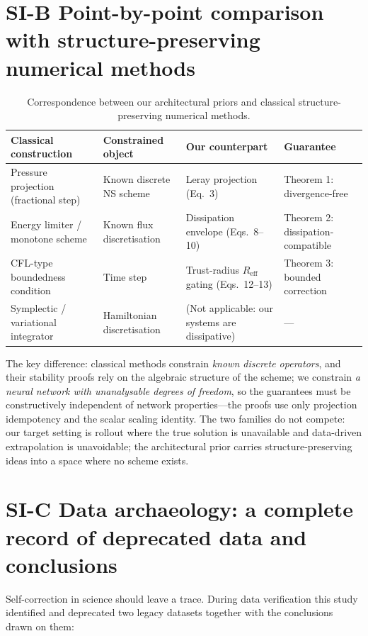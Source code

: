 \documentclass[11pt,a4paper]{article}
\begin{document}
\section*{SI-B \quad Point-by-point comparison with structure-preserving numerical methods}

\begin{table}[htbp]
\centering\small
\caption{Correspondence between our architectural priors and classical structure-preserving numerical methods.}
\begin{tabular}{llll}
\toprule
Classical construction & Constrained object & Our counterpart & Guarantee \\
\midrule
Pressure projection (fractional step) & Known discrete NS scheme & Leray projection (Eq.~3) & Theorem 1: divergence-free \\
Energy limiter / monotone scheme & Known flux discretisation & Dissipation envelope (Eqs.~8--10) & Theorem 2: dissipation-compatible \\
CFL-type boundedness condition & Time step & Trust-radius $R_{\mathrm{eff}}$ gating (Eqs.~12--13) & Theorem 3: bounded correction \\
Symplectic / variational integrator & Hamiltonian discretisation & (Not applicable: our systems are dissipative) & --- \\
\bottomrule
\end{tabular}
\end{table}

The key difference: classical methods constrain \emph{known discrete operators}, and their stability proofs rely on the algebraic structure of the scheme; we constrain \emph{a neural network with unanalysable degrees of freedom}, so the guarantees must be constructively independent of network properties---the proofs use only projection idempotency and the scalar scaling identity. The two families do not compete: our target setting is rollout where the true solution is unavailable and data-driven extrapolation is unavoidable; the architectural prior carries structure-preserving ideas into a space where no scheme exists.

\section*{SI-C \quad Data archaeology: a complete record of deprecated data and conclusions}

Self-correction in science should leave a trace. During data verification this study identified and deprecated two legacy datasets together with the conclusions drawn on them:
\end{document}
